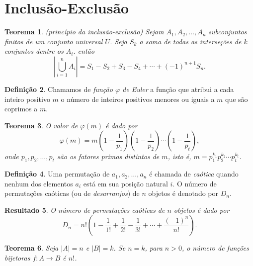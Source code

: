 \documentclass[12pt]{article}
\theoremstyle{plain}
\newtheorem{thm}{Teorema}[section]
\newtheorem{res}[thm]{Resultado}
\theoremstyle{definition}
\newtheorem{defn}[thm]{Definição}
\theoremstyle{remark}
\begin{document}
\section{Inclusão-Exclusão}

\begin{thm} (princípio da inclusão-exclusão)
    Sejam \(A_1, A_2, \ldots, A_n\) subconjuntos finitos de um conjunto universal \(U\). Seja \(S_k\) a soma de todas as interseções de \(k\) conjuntos dentre os \(A_i\). então
    \begin{equation}
        \left| \bigcup_{i=1}^{n} A_i \right| = S_1 - S_2 + S_3 - S_4 + \cdots + (-1)^{n+1} S_n.
    \end{equation}
\end{thm}

\begin{defn}
    Chamamos de \emph{função \(\varphi\) de Euler} a função que atribui a cada inteiro positivo \(m\) o número de inteiros positivos menores ou iguais a \(m\) que são coprimos a \(m\).
\end{defn}

\begin{thm}
    O valor de \(\varphi(m)\) é dado por
    \begin{equation}
        \varphi(m) = m \left( 1 - \frac{1}{p_1} \right) \left( 1 - \frac{1}{p_2} \right) \cdots \left( 1 - \frac{1}{p_t} \right),
    \end{equation}
    \noindent onde \(p_1, p_2, \ldots, p_t\) são os fatores primos distintos de \(m\), isto é, \(m = p_1^{k_1} p_2^{k_2} \cdots p_t^{k_t}\).
\end{thm}

\begin{defn}
    Uma permutação de \(a_1, a_2, \ldots, a_n\) é chamada de \emph{caótica} quando nenhum dos elementos \(a_i\) está em sua posição natural \(i\). O número de permutações caóticas (ou de \emph{desarranjos}) de \(n\) objetos é denotado por \(D_n\).
\end{defn}

\begin{res}
    O número de permutações caóticas de \(n\) objetos é dado por
    \begin{equation}
        D_n = n! \left( 1 - \frac{1}{1!} + \frac{1}{2!} - \frac{1}{3!} + \cdots + \frac{(-1)^n}{n!} \right).
    \end{equation}
\end{res}

\begin{thm}
    Seja \(\vert A \vert = n\) e \(\vert B \vert = k\). Se \(n=k\), para \(n>0\), o número de funções bijetoras \(f: A \to B\) é \(n!\).
\end{thm}
\end{document}
